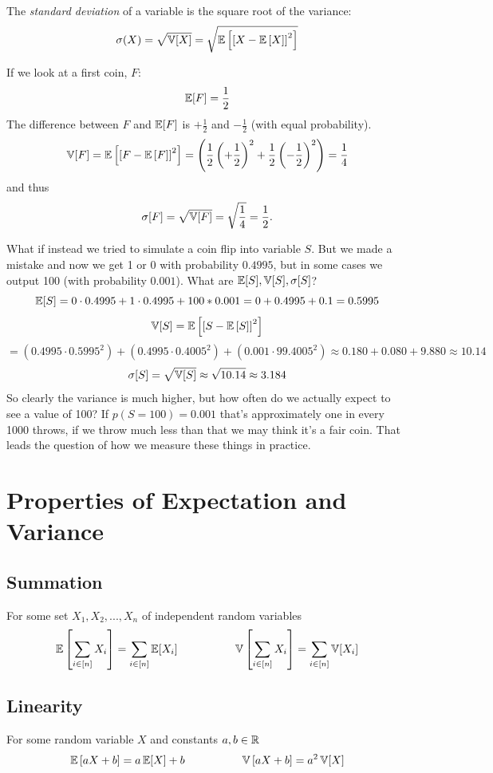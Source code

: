 The \emph{standard deviation} of a variable is the square root of the variance:
\[\sigma(X) = \sqrt{\operatorname{\mathbb{V}}[X]} = \sqrt{ \operatorname{\mathbb{E}}\left[\left[X-\operatorname{\mathbb{E}}\left[X\right]\right]^2\right]}\]

If we look at a first coin, $F$:
\[\operatorname{\mathbb{E}}[F] = \frac{1}{2}\]
The difference between $F$ and $\operatorname{\mathbb{E}}[F]$ is $+\frac{1}{2}$ and $-\frac{1}{2}$ (with equal probability). 
\[\operatorname{\mathbb{V}}[F] = \operatorname{\mathbb{E}}\left[\left[F-\operatorname{\mathbb{E}}\left[F\right]\right]^2\right] = \left(\frac{1}{2}\left(+\frac{1}{2}\right)^2 + \frac{1}{2}\left(-\frac{1}{2}\right)^2\right) = \frac{1}{4}\]
and thus
\[\sigma[F] = \sqrt{\operatorname{\mathbb{V}}[F]} = \sqrt{\frac{1}{4}} =\frac{1}{2}.\]

What if instead we tried to simulate a coin flip into variable $S$. 
But we made a mistake and now we get 1 or 0 with probability $0.4995$, but in some cases we output 100 (with probability $0.001$). 
What are $\operatorname{\mathbb{E}}[S], \operatorname{\mathbb{V}}[S], \sigma[S]$?
\[\operatorname{\mathbb{E}}[S] = 0 \cdot 0.4995 + 1 \cdot 0.4995 + 100 * 0.001 = 0 + 0.4995 + 0.1 = 0.5995\]
\[\operatorname{\mathbb{V}}[S] = \operatorname{\mathbb{E}}\left[\left[S-\operatorname{\mathbb{E}}\left[S\right]\right]^2\right] \]\[ = \left(0.4995 \cdot 0.5995^2\right) + \left(0.4995 \cdot 0.4005^2\right) + \left(0.001 \cdot  99.4005^2\right) 
\approx  0.180 + 0.080 + 9.880 \approx 10.14\]
\[\sigma[S] = \sqrt{\operatorname{\mathbb{V}}[S]} \approx \sqrt{10.14} \approx 3.184\]
So clearly the variance is much higher, but how often do we actually expect to see a value of 100? 
If $p(S=100)=0.001$ that's approximately one in every 1000 throws,
if we throw much less than that we may think it's a fair coin. 
That leads the question of how we measure these things in practice. 

\section{Properties of Expectation and Variance}

\subsection{Summation}
For some set $X_1, X_2, ..., X_n$ of independent random variables
\[\operatorname{\mathbb{E}}\left[\sum_{i\in[n]} X_i\right] = \sum_{i\in[n]} \operatorname{\mathbb{E}}[X_i] \hspace{5em} 
\operatorname{\mathbb{V}}\left[\sum_{i\in[n]} X_i\right] = \sum_{i\in[n]} \operatorname{\mathbb{V}}[X_i]\]

\subsection{Linearity}
For some random variable $X$ and constants $a,b\in\operatorname{\mathbb{R}}$
\[\operatorname{\mathbb{E}}\left[aX+b\right] = a\operatorname{\mathbb{E}}[X]+b \hspace{5em} 
\operatorname{\mathbb{V}}\left[aX+b\right] = a^2\operatorname{\mathbb{V}}[X]\]

